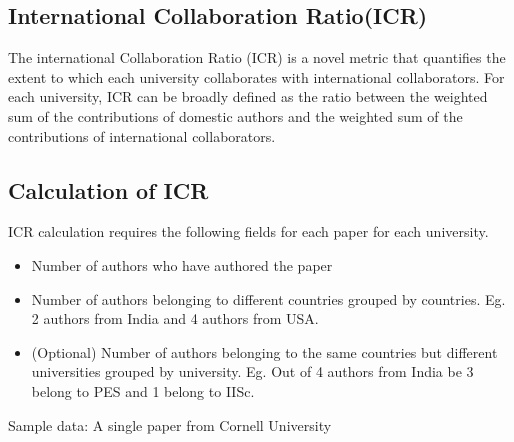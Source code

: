 \documentclass{article}
\begin{document}
\subsection{International Collaboration Ratio(ICR)}

The international Collaboration Ratio (ICR) is a novel metric that quantifies the extent to which each university collaborates with international collaborators. For each university, ICR can be broadly defined as the ratio between the weighted sum of the contributions of domestic authors and the weighted sum of the contributions of international collaborators.


\subsection{Calculation of ICR}
        \item ICR calculation requires the following fields for each paper for each university.
        \begin{itemize}
  \item Number of authors who have authored the paper
  \item Number of authors belonging to different countries grouped by countries. Eg. 2 authors from India and 4 authors from USA.
  \item (Optional) Number of authors belonging to the same countries but different universities grouped by university. Eg. Out of 4 authors from India be 3 belong to PES and 1 belong to IISc.
\end{itemize}
      \begin{center}
          {\tiny \item Sample data: A single paper from Cornell University}
    \end{center}
\end{document}
